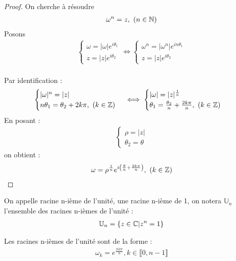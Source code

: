 \begin{proof}
On cherche à résoudre
\begin{align*}
\omega^n = z, \ (n \in \mathbb{N})
\end{align*}
Posons
\begin{align*}
\begin{cases}
\omega = |\omega|e^{i \theta_1} \\
z = |z| e^{i \theta_2}
\end{cases} 
\iff 
\begin{cases}
\omega^n = |\omega^n|e^{i n \theta_1} \\
z = |z| e^{i \theta_2}
\end{cases}
\end{align*}
\\
Par identification :
\begin{align*}
\begin{cases}
|\omega|^n = |z| \\
n \theta_1 = \theta_2 + 2k \pi,\ (k \in \mathbb{Z})
\end{cases}
\iff 
\begin{cases}
|\omega| = |z|^{\frac{1}{n}} \\
\theta_1 = \frac{\theta_2}{n} + \frac{2 k \pi}{n},\ (k \in \mathbb{Z})
\end{cases}
\end{align*}
En posant :
\begin{align*}
\begin{cases}
\rho = |z| \\
\theta_2 = \theta
\end{cases}
\end{align*}
on obtient :
\begin{align*}
\omega = \rho^{\frac{1}{n}} e^{i \left( \frac{\theta}{n} + \frac{2k\pi}{n} \right)},\ (k \in \mathbb{Z})
\end{align*}
\end{proof}

\begin{definition}
    On appelle racine n-ième de l'unité, une racine n-ième de 1, on notera $\mathbb{U}_n$ l'ensemble des racines n-ièmes de l'unité :
    \begin{align*}
        \mathbb{U}_n = \{z \in \mathbb{C} | z^n = 1 \} 
    \end{align*}
\end{definition}

\begin{proposition}
Les racines n-ièmes de l'unité sont de la forme :
    \begin{align*}
        \omega_k = e^{\frac{2ik\pi}{n}}, k \in \llbracket 0, n - 1 \rrbracket 
    \end{align*}
\end{proposition}


